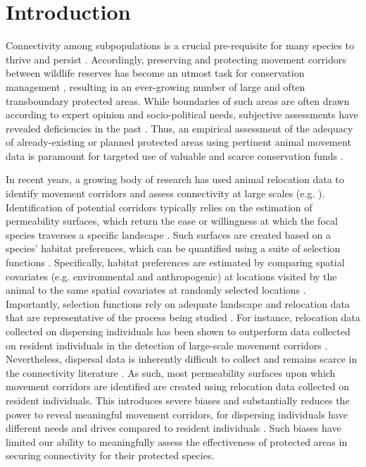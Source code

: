 \documentclass[abstract=on,10pt,a4paper,bibliography=totocnumbered]{article}
\begin{document}
\newpage


\linenumbers

\section{Introduction}
Connectivity among subpopulations is a crucial pre-requisite for many species to
thrive and persist \citep{Fahrig.2003}. Accordingly, preserving and protecting
movement corridors between wildlife reserves has become an utmost task for
conservation management \citep{Doerr.2011, Rudnick.2012}, resulting in an
ever-growing number of large and often transboundary protected areas. While
boundaries of such areas are often drawn according to expert opinion and
socio-political needs, subjective assessments have revealed deficiencies in the
past \citep{Clevenger.2002, Pullinger.2010}. Thus, an empirical assessment of
the adequacy of already-existing or planned protected areas using pertinent
animal movement data is paramount for targeted use of valuable and scarce
conservation funds \citep{Pullinger.2010}.

In recent years, a growing body of research has used animal relocation data to
identify movement corridors and assess connectivity at large scales (e.g.
\citealp{Chetkiewicz.2006, Squires.2013, Elliot.2014}). Identification of
potential corridors typically relies on the estimation of permeability surfaces,
which return the ease or willingness at which the focal species traverses a
specific landscape \citep{Sawyer.2011}. Such surfaces are created based on a
species' habitat preferences, which can be quantified using a suite of selection
functions \citep{Zeller.2012}. Specifically, habitat preferences are estimated
by comparing spatial covariates (e.g. environmental and anthropogenic) at
locations visited by the animal to the same spatial covariates at randomly
selected locations \citep{Zeller.2012}. Importantly, selection functions rely on
adequate landscape and relocation data that are representative of the process
being studied \citep{Diniz.2020}. For instance, relocation data collected on
dispersing individuals has been shown to outperform data collected on resident
individuals in the detection of large-scale movement corridors
\citep{Elliot.2014, Diniz.2020}. Nevertheless, dispersal data is inherently
difficult to collect and remains scarce in the connectivity literature
\citep{Vasudev.2015}. As such, most permeability surfaces upon which movement
corridors are identified are created using relocation data collected on resident
individuals. This introduces severe biases and substantially reduces the power
to reveal meaningful movement corridors, for dispersing individuals have
different needs and drives compared to resident individuals \citep{Elliot.2014,
Cozzi.2020}. Such biases have limited our ability to meaningfully assess the
effectiveness of protected areas in securing connectivity for their protected
species.
\end{document}
